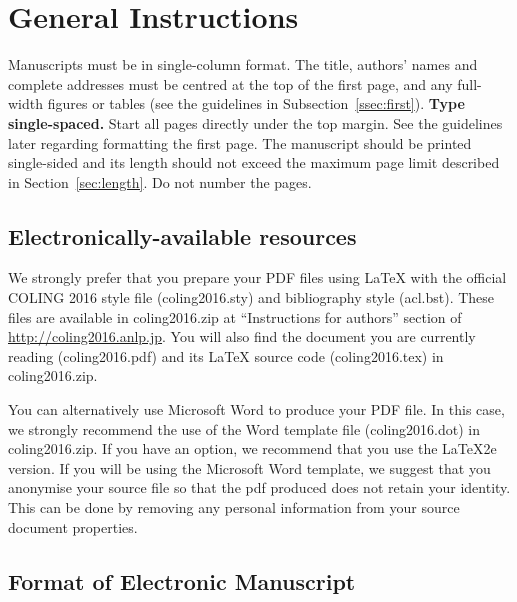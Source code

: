 \documentclass[11pt]{article}
\begin{document}



\section{General Instructions}

Manuscripts must be in single-column format.
The title, authors' names and complete
addresses
must be centred at the top of the first page, and
any full-width figures or tables (see the guidelines in
Subsection~\ref{ssec:first}). {\bf Type single-spaced.}  Start all
pages directly under the top margin. See the guidelines later
regarding formatting the first page.  The manuscript should be
printed single-sided and its length
should not exceed the maximum page limit described in Section~\ref{sec:length}.
Do not number the pages.


\subsection{Electronically-available resources}

We strongly prefer that you prepare your PDF files using \LaTeX{} with
the official COLING 2016 style file (coling2016.sty) and bibliography style
(acl.bst). These files are available in coling2016.zip 
at ``Instructions for authors'' section of \url{http://coling2016.anlp.jp}.
You will also find the document
you are currently reading (coling2016.pdf) and its \LaTeX{} source code
(coling2016.tex) in coling2016.zip. 

You can alternatively use Microsoft Word to produce your PDF file. In
this case, we strongly recommend the use of the Word template file
(coling2016.dot) in coling2016.zip. If you have an option, we
recommend that you use the \LaTeX2e{} version. If you will be
  using the Microsoft Word template, we suggest that you anonymise
  your source file so that the pdf produced does not retain your
  identity.  This can be done by removing any personal information
from your source document properties.



\subsection{Format of Electronic Manuscript}
\label{sect:pdf}
\end{document}
